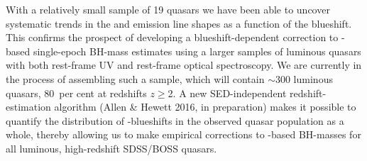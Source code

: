 With a relatively small sample of 19 quasars we have been able to uncover systematic trends in the  and \ha emission line shapes as a function of the  blueshift.
This confirms the prospect of developing a blueshift-dependent correction to -based single-epoch BH-mass estimates using a larger samples of luminous quasars with both rest-frame UV and rest-frame optical spectroscopy. 
We are currently in the process of assembling such a sample, which will contain $\sim$300 luminous quasars, 80\, per cent at redshifts $z\geq$2.    
A new SED-independent redshift-estimation algorithm (Allen \& Hewett 2016, in preparation) makes it possible to quantify the distribution of -blueshifts in the observed quasar population as a whole, thereby allowing us to make empirical corrections to -based BH-masses for all luminous, high-redshift SDSS/BOSS quasars.